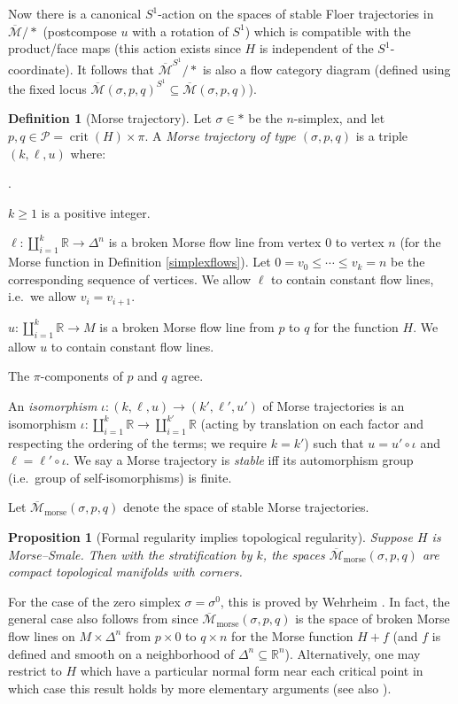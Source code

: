 \documentclass[12pt]{article}
\newtheorem{proposition}[theorem]{Proposition}
\theoremstyle{definition}
\newtheorem{definition}[theorem]{Definition}
\theoremstyle{remark}
\numberwithin{equation}{subsection}
\newcommand{\RR}{\mathbb R}
\newcommand{\PPP}{\mathcal P}
\newcommand{\Mbar}{\overline{\mathcal M}}
\newcommand{\crit}{\operatorname{crit}}
\newcommand{\morse}{\mathrm{morse}}
\newcounter{rcounti}
\newenvironment{rlist}{\begin{list}{\roman{rcounti}.}{\usecounter{rcounti}
\setlength\itemsep{0pt}
\setlength\labelsep{4pt}
\setlength\labelwidth{16pt}
\setlength\leftmargin{32pt}
\setlength\listparindent{0pt}
\setlength\parsep{0pt}
\setlength\parskip{0pt}
\setlength\partopsep{0pt}
\setlength\rightmargin{0pt}
\setlength\topsep{0pt}
\setlength\itemindent{0pt}
}}{\end{list}}
\begin{document}
Now there is a canonical $S^1$-action on the spaces of stable Floer trajectories in $\Mbar/\ast$ (postcompose $u$ with a rotation of $S^1$) which is compatible with the product/face maps (this action exists since $H$ is independent of the $S^1$-coordinate).  It follows that $\Mbar^{S^1}/\ast$ is also a flow category diagram (defined using the fixed locus $\Mbar(\sigma,p,q)^{S^1}\subseteq\Mbar(\sigma,p,q)$).

\begin{definition}[Morse trajectory]\label{morseTdef}
Let $\sigma\in\ast$ be the $n$-simplex, and let $p,q\in\PPP=\crit(H)\times\pi$.  A \emph{Morse trajectory of type $(\sigma,p,q)$} is a triple $(k,\ell,u)$ where:
\begin{rlist}
\item$k\geq 1$ is a positive integer.
\item$\ell:\coprod_{i=1}^k\RR\to\Delta^n$ is a broken Morse flow line from vertex $0$ to vertex $n$ (for the Morse function in Definition \ref{simplexflows}).  Let $0=v_0\leq\cdots\leq v_k=n$ be the corresponding sequence of vertices.  We allow $\ell$ to contain constant flow lines, i.e.\ we allow $v_i=v_{i+1}$.
\item$u:\coprod_{i=1}^k\RR\to M$ is a broken Morse flow line from $p$ to $q$ for the function $H$.  We allow $u$ to contain constant flow lines.
\item The $\pi$-components of $p$ and $q$ agree.
\end{rlist}
An \emph{isomorphism} $\iota:(k,\ell,u)\to(k',\ell',u')$ of Morse trajectories is an isomorphism $\iota:\coprod_{i=1}^k\RR\to\coprod_{i=1}^{k'}\RR$ (acting by translation on each factor and respecting the ordering of the terms; we require $k=k'$) such that $u=u'\circ\iota$ and $\ell=\ell'\circ\iota$.  We say a Morse trajectory is \emph{stable} iff its automorphism group (i.e.\ group of self-isomorphisms) is finite.

Let $\Mbar_\morse(\sigma,p,q)$ denote the space of stable Morse trajectories.
\end{definition}

\begin{proposition}[Formal regularity implies topological regularity]\label{morseassumptionMS}
Suppose $H$ is Morse--Smale.  Then with the stratification by $k$, the spaces $\Mbar_\morse(\sigma,p,q)$ are compact topological manifolds with corners.
\end{proposition}

For the case of the zero simplex $\sigma=\sigma^0$, this is proved by Wehrheim \cite{wehrheimMS}.  In fact, the general case also follows from \cite{wehrheimMS} since $\Mbar_\morse(\sigma,p,q)$ is the space of broken Morse flow lines on $M\times\Delta^n$ from $p\times 0$ to $q\times n$ for the Morse function $H+f$ (and $f$ is defined and smooth on a neighborhood of $\Delta^n\subseteq\RR^n$).  Alternatively, one may restrict to $H$ which have a particular normal form near each critical point in which case this result holds by more elementary arguments (see also \cite{wehrheimMS}).
\end{document}

